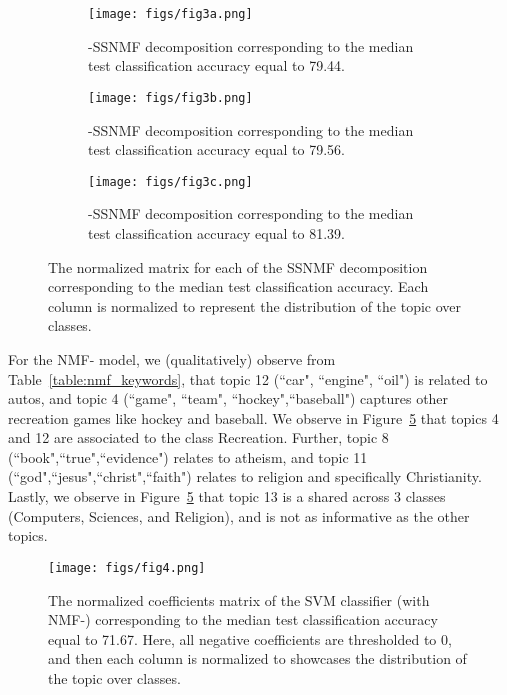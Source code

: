 \documentclass[twocolumn,10pt]{article}
\begin{document}
\begin{figure}[ht]
    \centering
     \begin{subfigure}[b]{\columnwidth}
     \centering
    \texttt{[image: figs/fig3a.png]}
     \caption{-SSNMF decomposition corresponding to the median test classification accuracy equal to 79.44.}
     \label{fig:Model3_Normalized}
     \end{subfigure}
\begin{subfigure}[b]{\columnwidth}
     \centering
    \texttt{[image: figs/fig3b.png]}
     \caption{-SSNMF decomposition corresponding to the median test classification accuracy equal to 79.56.}
     \label{fig:Model4_Normalized}
     \end{subfigure}
\begin{subfigure}[b]{\columnwidth}
     \centering
    \texttt{[image: figs/fig3c.png]}
     \caption{-SSNMF decomposition corresponding to the median test classification accuracy equal to 81.39.}
     \label{fig:Model6_Normalized}
     \end{subfigure}
\caption{The normalized  matrix for each of the SSNMF decomposition corresponding to the median test classification accuracy. Each column is normalized to represent the distribution of the topic over classes.}
    \label{fig:ssnmf_models_heatmap}
\end{figure}
For the NMF- model, we (qualitatively) observe from Table~\ref{table:nmf_keywords}, that topic 12 (``car", ``engine", ``oil") is related to autos, and topic 4 (``game", ``team", ``hockey",``baseball") captures other recreation games like hockey and baseball.
We observe in Figure~\ref{fig:nmf_heatmap} that topics 4 and 12 are associated to the class Recreation.
Further, topic 8 (``book",``true",``evidence") relates to atheism, and topic 11 (``god",``jesus",``christ",``faith") relates to religion and specifically Christianity.
Lastly, we observe in Figure~\ref{fig:nmf_heatmap} that topic 13 is a shared across 3 classes (Computers, Sciences, and Religion), and is not as informative as the other topics.
\begin{figure}[ht]
    \centering
    \texttt{[image: figs/fig4.png]}
    \caption{The normalized coefficients matrix of the SVM classifier (with NMF-) corresponding to the median test classification accuracy equal to 71.67. Here, all negative coefficients are thresholded to 0, and then each column is normalized to showcases the distribution of the topic over classes.}
    \label{fig:nmf_heatmap}
\end{figure}
\end{document}
